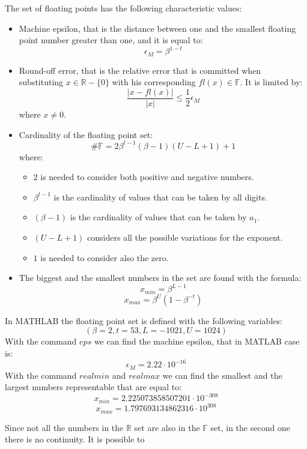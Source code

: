 \documentclass[12pt, a4paper]{report}
\newtheorem[style=M,bodystyle=\normalfont]{theorem}{Theorem}
\newtheorem[style=M,bodystyle=\normalfont]{corollary}{Corollary}
\newtheorem[style=M,bodystyle=\normalfont]{lemma}{Lemma}
\newtheorem[style=M,bodystyle=\normalfont]{definition}{Definition}
\begin{document}
    The set of floating points has the following characteristic values:
    \begin{itemize}
        \item Machine epsilon, that is the distance between one and the smallest floating point number greater than one, and it is equal to: 
            \[\epsilon_M=\beta^{1-t}\]
        \item Round-off error, that is the relative error that is committed when substituting $x \in \mathbb{R}-\{0\}$ with his corresponding 
            $fl(x) \in \mathbb{F}$. It is limited by: 
            \[\dfrac{\left\lvert x-fl(x) \right\rvert}{\left\lvert x \right\rvert }\leq \dfrac{1}{2}\epsilon_M\]
            where $x \neq 0$.
        \item Cardinality of the floating point set:
            \[\#\mathbb{F}=2 \beta^{t-1}(\beta -1)(U-L+1)+1\]
            where: 
            \begin{itemize}
                \item $2$ is needed to consider both positive and negative numbers. 
                \item $\beta^{t-1}$ is the cardinality of values that can be taken by all digits.
                \item $(\beta -1)$ is the cardinality of values that can be taken by $a_1$.
                \item $(U-L+1)$ considers all the possible variations for the exponent.
                \item $1$ is needed to consider also the zero. 
            \end{itemize}
        \item The biggest and the smallest numbers in the set are found with the formula:
            \[x_{min}=\beta^{L-1}\]
            \[x_{max}=\beta^U(1-\beta^{-t})\]
    \end{itemize}
    \begin{example}
        In MATHLAB the floating point set is defined with the following variables:
        \[(\beta=2,t=53,L=-1021,U=1024)\] 
        With the command $eps$ we can find the machine epsilon, that in MATLAB case is:
        \[\epsilon_M=2.22 \cdot 10^{-16}\]
        With the command $realmin$ and $realmax$ we can find the smallest and the largest numbers representable that are equal to:
        \[x_{min}=2.225073858507201 \cdot 10^{-308}\]
        \[x_{max}=1.797693134862316 \cdot 10^{308}\]
    \end{example}
    Since not all the numbers in the $\mathbb{R}$ set are also in the $\mathbb{F}$ set, in the second one there is no continuity. It is possible to 
\end{document}
